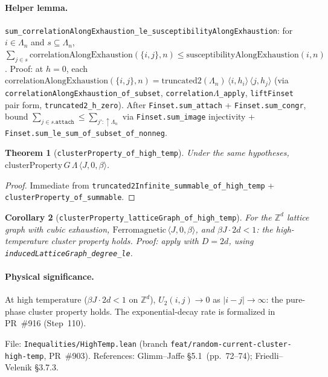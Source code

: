 \documentclass[a4paper,11pt]{article}
\newtheorem{theorem}{Theorem}
\newtheorem{corollary}[theorem]{Corollary}
\newcommand{\LeanLambda}{\texorpdfstring{\ensuremath{\Lambda}}{Lambda}}
\begin{document}
\paragraph{Helper lemma.}
\texttt{sum\_correlationAlongExhaustion\_le\_susceptibilityAlongExhaustion}:
for $i\in\Lambda_n$ and $s\subseteq\Lambda_n$,
$\sum_{j\in s}\mathrm{correlationAlongExhaustion}(\{i,j\},n)
\le \mathrm{susceptibilityAlongExhaustion}(i,n)$.
Proof: at $h=0$, each $\mathrm{correlationAlongExhaustion}(\{i,j\},n)
= \mathrm{truncated2}(\Lambda_n)\,\langle i,h_i\rangle\,\langle j,h_j\rangle$
(via \texttt{correlationAlongExhaustion\_of\_subset}, \texttt{correlation\LeanLambda\_apply},
\texttt{liftFinset} pair form, \texttt{truncated2\_h\_zero}).
After \texttt{Finset.sum\_attach} + \texttt{Finset.sum\_congr}, bound
$\sum_{j\in s.\mathtt{attach}} \le \sum_{j':\uparrow\Lambda_n}$
via \texttt{Finset.sum\_image} injectivity + \texttt{Finset.sum\_le\_sum\_of\_subset\_of\_nonneg}.

\begin{theorem}[\texttt{clusterProperty\_of\_high\_temp}]
Under the same hypotheses, $\mathrm{clusterProperty}\,G\,\Lambda\,\langle J,0,\beta\rangle$.
\end{theorem}

\begin{proof}
Immediate from \texttt{truncated2Infinite\_summable\_of\_high\_temp} +
\texttt{clusterProperty\_of\_summable}.
\end{proof}

\begin{corollary}[\texttt{clusterProperty\_latticeGraph\_of\_high\_temp}]
For the $\mathbb{Z}^d$ lattice graph with cubic exhaustion,
$\mathrm{Ferromagnetic}\,\langle J,0,\beta\rangle$, and $\beta J\cdot 2d < 1$:
the high-temperature cluster property holds.
Proof: apply with $D=2d$, using \texttt{inducedLatticeGraph\_degree\_le}.
\end{corollary}

\paragraph{Physical significance.}
At high temperature ($\beta J \cdot 2d < 1$ on $\mathbb{Z}^d$),
$U_2(i,j)\to 0$ as $|i-j|\to\infty$: the pure-phase cluster property holds.
The exponential-decay rate is formalized in PR~\#916 (Step~110).

File: \texttt{Inequalities/HighTemp.lean} (branch \texttt{feat/random-current-cluster-high-temp}, PR~\#903).
References: Glimm--Jaffe \S5.1~(pp.~72--74); Friedli--Velenik \S3.7.3.
\end{document}
